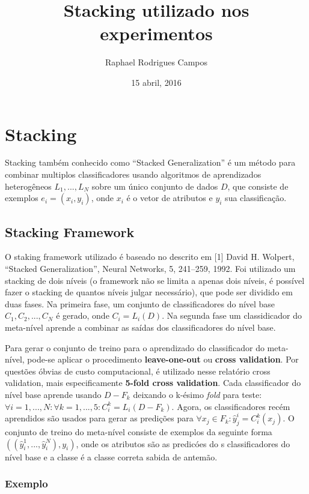 \documentclass[]{article}
\title{Stacking utilizado nos experimentos}
\author{Raphael Rodrigues Campos}
\date{15 abril, 2016}
\begin{document}
\maketitle


\section{Stacking}\label{stacking}

Stacking também conhecido como ``Stacked Generalization'' é um método
para combinar multiplos classificadores usando algoritmos de
aprendizados heterogêneos \(L_1, ..., L_N\) sobre um único conjunto de
dados \(D\), que consiste de exemplos \(e_i = (x_i, y_i)\), onde \(x_i\)
é o vetor de atributos e \(y_i\) sua classificação.

\subsection{Stacking Framework}\label{stacking-framework}

O staking framework utilizado é baseado no descrito em {[}1{]} David H.
Wolpert, ``Stacked Generalization'', Neural Networks, 5, 241--259, 1992.
Foi utilizado um stacking de dois níveis (o framework não se limita a
apenas dois níveis, é possível fazer o stacking de quantos níveis julgar
necessário), que pode ser dividido em duas fases. Na primeira fase, um
conjunto de classificadores do nível base \(C_1, C_2, ..., C_N\) é
gerado, onde \(C_i = L_i(D)\). Na segunda fase um classidicador do
meta-nível aprende a combinar as saídas dos classificadores do nível
base.

Para gerar o conjunto de treino para o aprendizado do classificador do
meta-nível, pode-se aplicar o procedimento \textbf{leave-one-out} ou
\textbf{cross validation}. Por questões óbvias de custo computacional, é
utilizado nesse relatório cross validation, mais especificamente
\textbf{5-fold cross validation}. Cada classificador do nível base
aprende usando \(D - F_k\) deixando o k-ésimo \emph{fold} para teste:
\(\forall i = 1,...,N : \forall k = 1,...,5 : C^{k}_i = L_i(D-F_k)\).
Agora, os classificadores recém aprendidos são usados para gerar as
predições para \(\forall x_j \in F_k:\hat{y}_j^i=C^k_i(x_j)\). O
conjunto de treino do meta-nível consiste de exemplos da seguinte forma
\(((\hat{y}_i^1,..., \hat{y}_i^N), y_i)\), onde os atributos são as
predicóes do s classificadores do nível base e a classe é a classe
correta sabida de antemão.

\subsubsection{Exemplo}\label{exemplo}
\end{document}
